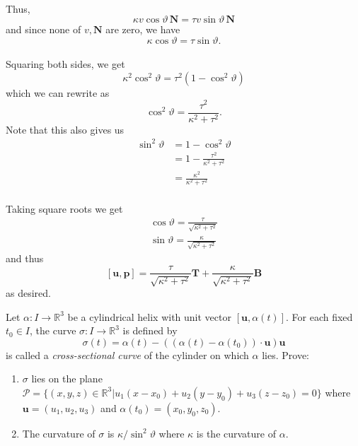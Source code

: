 \documentclass[12 pt, letterpaper]{hmcpset}
\begin{document}
\begin{solution}
\begin{enumerate}
\[\begin{split}
				\end{split}
			\]
			Thus,
			\[
				\kappa v \cos{\vartheta} \, \mathbf{N} = \tau v \sin{\vartheta} \, \mathbf{N}
			\]
			and since none of $v, \mathbf{N}$ are zero, we have
			\[
				\kappa \cos{\vartheta} = \tau \sin{\vartheta}.
			\] \\
			Squaring both sides, we get
			\[
				\kappa^{2} \cos^{2}{\vartheta} = \tau^{2} (1 - \cos^{2}{\vartheta})
			\]
			which we can rewrite as
			\[
				\cos^{2}{\vartheta} = \frac{\tau^{2}}{\kappa^{2} + \tau^{2}}.
			\]
			Note that this also gives us
			\[
				\begin{split}
					\sin^{2}{\vartheta} & = 1 - \cos^{2}{\vartheta} \\
							    & = 1 - \frac{\tau^{2}}{\kappa^{2} + \tau^{2}} \\
							    & = \frac{\kappa^{2}}{\kappa^{2} + \tau^{2}} 
				\end{split}
			\] \\
			Taking square roots we get
			\[
				\begin{gathered}
					\cos{\vartheta} = \frac{\tau}{\sqrt{\kappa^{2} + \tau^{2}}} \\
					\sin{\vartheta} = \frac{\kappa}{\sqrt{\kappa^{2} + \tau^{2}}}
				\end{gathered}
			\]
			and thus
			\[
				[\mathbf{u}, \mathbf{p}] = \frac{\tau}{\sqrt{\kappa^{2} + \tau^{2}}} \mathbf{T} + \frac{\kappa}{\sqrt{\kappa^{2} + \tau^{2}}} \mathbf{B}
			\]
			as desired.
	\end{enumerate}
\end{solution}

\pagebreak

\begin{problem}[Problem 3.]
	Let $\alpha : I \to \mathbb{R}^{3}$ be a cylindrical helix with unit vector $[\mathbf{u}, \alpha(t)]$. For each fixed $t_{0} \in I$, the curve $\sigma : I \to \mathbb{R}^{3}$ is defined by
	\[
		\sigma(t) = \alpha(t) - ((\alpha(t) - \alpha(t_{0})) \cdot \mathbf{u}) \mathbf{u}
	\]
	is called a \textit{cross-sectional curve} of the cylinder on which $\alpha$ lies. Prove:
	\begin{enumerate}
		\item $\sigma$ lies on the plane $\mathcal{P} = \{ (x, y, z) \in \mathbb{R}^{3} | u_{1}(x - x_{0}) + u_{2}(y - y_{0}) + u_{3}(z - z_{0}) = 0 \}$ where $\mathbf{u} = (u_{1}, u_{2}, u_{3})$ and $\alpha(t_{0}) = (x_{0}, y_{0}, z_{0})$. 
		\item The curvature of $\sigma$ is $\kappa/\sin^{2}{\vartheta}$ where $\kappa$ is the curvature of $\alpha$.
	\end{enumerate}
\end{problem}
\end{document}

